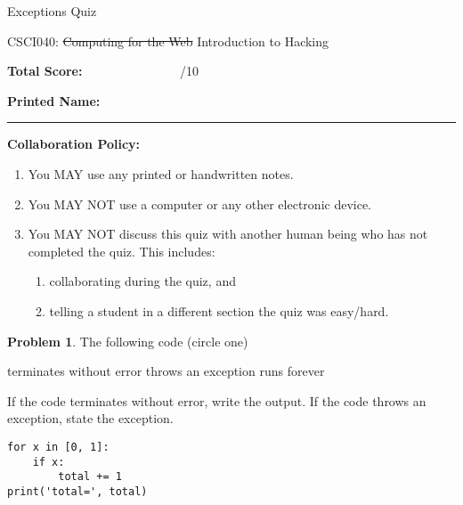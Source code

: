 \documentclass[10pt]{article}
\theoremstyle{definition}
\newtheorem{problem}{Problem}
\begin{document}
\begin{center}
    {
\Large
    Exceptions Quiz
}

    \vspace{0.1in}
    CSCI040: \sout{Computing for the Web} Introduction to Hacking

    \vspace{0.1in}
\end{center}


\vspace{0.15in}
\noindent
\textbf{Total Score:} ~~~~~~~~~~~~~~~/10

\vspace{0.5in}
\noindent
\textbf{Printed Name:}

\noindent
\rule{\textwidth}{0.1pt}
\vspace{0.25in}

\noindent
\textbf{Collaboration Policy:}
\begin{enumerate}
    \item You MAY use any printed or handwritten notes.
    \item You MAY NOT use a computer or any other electronic device.
    \item You MAY NOT discuss this quiz with another human being who has not completed the quiz.
        This includes:
        \begin{enumerate}
            \item collaborating during the quiz, and
            \item telling a student in a different section the quiz was easy/hard.
        \end{enumerate}
\end{enumerate}

\vspace{0.15in}


\begin{problem}
    The following code (circle one)

    \vspace{0.25in}
    \hspace{0.5in}terminates without error 
    \hspace{1in}throws an exception
    \hspace{1in}runs forever
    \vspace{0.25in}

    \noindent
    If the code terminates without error, write the output.
    If the code throws an exception, state the exception.
\end{problem}
\begin{lstlisting}
for x in [0, 1]:
    if x:
        total += 1
print('total=', total)
\end{lstlisting}
\vspace{1in}
\end{document}
